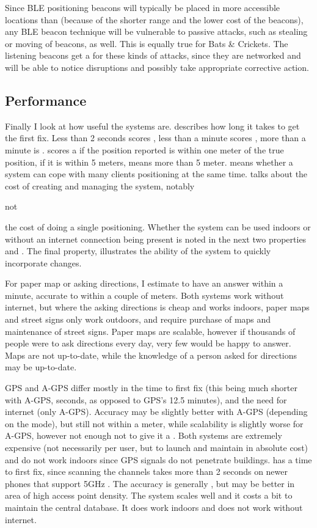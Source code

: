 Since BLE positioning beacons will typically be placed in more accessible locations than \wifi (because of the shorter range and the lower cost of the beacons), any BLE beacon technique will be vulnerable to passive attacks, such as stealing or moving of beacons, as well.
This is equally true for Bats \& Crickets.
The listening beacons get a \maybe for these kinds of attacks, since they are networked and will be able to notice disruptions and possibly take appropriate corrective action.

\subsection{Performance}
Finally I look at how useful the systems are.
 describes how long it takes to get the first fix.
Less than 2 seconds scores \yes, less than a minute scores \maybe, more than a minute is \no.
 scores a \yes if the position reported is within one meter of the true position, \maybe if it is within 5 meters, \no means more than 5 meter.
 means whether a system can cope with many clients positioning at the same time.
 talks about the cost of creating and managing the system, notably \begin{em}not\end{em} the cost of doing a single positioning.
Whether the system can be used indoors or without an internet connection being present is noted in the next two properties  and .
The final property,  illustrates the ability of the system to quickly incorporate changes.

For paper map or asking directions, I estimate to have an answer within a minute, accurate to within a couple of meters.
Both systems work without internet, but where the asking directions is cheap and works indoors, paper maps and street signs only work outdoors, and require purchase of maps and maintenance of street signs.
Paper maps are scalable, however if thousands of people were to ask directions every day, very few would be happy to answer.
Maps are not up-to-date, while the knowledge of a person asked for directions may be up-to-date.

GPS and A-GPS differ mostly in the time to first fix (this being much shorter with A-GPS, seconds, as opposed to GPS's 12.5 minutes), and the need for internet (only A-GPS).
Accuracy may be slightly better with A-GPS (depending on the mode), but still not within a meter, while scalability is slightly worse for A-GPS, however not enough not to give it a \no.
Both systems are extremely expensive (not necessarily per user, but to launch and maintain in absolute cost) and do not work indoors since GPS signals do not penetrate buildings.
\Wifi has a \maybe time to first fix, since scanning the \wifi channels takes more than 2 seconds on newer phones that support 5GHz \wifi.
The accuracy is generally \no, but may be better in area of high access point density.
The system scales well and it costs a bit to maintain the central database.
It does work indoors and does not work without internet.

